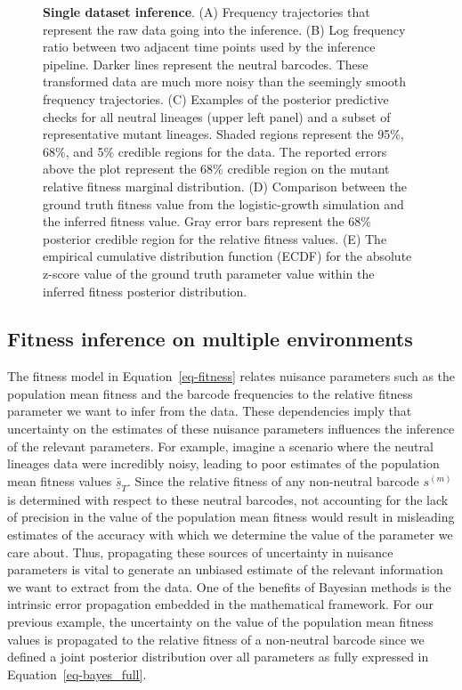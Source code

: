 \documentclass[
]{scrartcl}
\begin{document}
\begin{refsegment}
\begin{figure}
\caption{\label{fig-02}\textbf{Single dataset inference}. (A) Frequency
trajectories that represent the raw data going into the inference. (B)
Log frequency ratio between two adjacent time points used by the
inference pipeline. Darker lines represent the neutral barcodes. These
transformed data are much more noisy than the seemingly smooth frequency
trajectories. (C) Examples of the posterior predictive checks for all
neutral lineages (upper left panel) and a subset of representative
mutant lineages. Shaded regions represent the 95\%, 68\%, and 5\%
credible regions for the data. The reported errors above the plot
represent the 68\% credible region on the mutant relative fitness
marginal distribution. (D) Comparison between the ground truth fitness
value from the logistic-growth simulation and the inferred fitness
value. Gray error bars represent the 68\% posterior credible region for
the relative fitness values. (E) The empirical cumulative distribution
function (ECDF) for the absolute z-score value of the ground truth
parameter value within the inferred fitness posterior distribution.}

\end{figure}

\hypertarget{sec-multienv}{%
\subsection{Fitness inference on multiple
environments}\label{sec-multienv}}

The fitness model in Equation~\ref{eq-fitness} relates nuisance
parameters such as the population mean fitness and the barcode
frequencies to the relative fitness parameter we want to infer from the
data. These dependencies imply that uncertainty on the estimates of
these nuisance parameters influences the inference of the relevant
parameters. For example, imagine a scenario where the neutral lineages
data were incredibly noisy, leading to poor estimates of the population
mean fitness values \(\underline{\bar{s}}_T\). Since the relative
fitness of any non-neutral barcode \(s^{(m)}\) is determined with
respect to these neutral barcodes, not accounting for the lack of
precision in the value of the population mean fitness would result in
misleading estimates of the accuracy with which we determine the value
of the parameter we care about. Thus, propagating these sources of
uncertainty in nuisance parameters is vital to generate an unbiased
estimate of the relevant information we want to extract from the data.
One of the benefits of Bayesian methods is the intrinsic error
propagation embedded in the mathematical framework. For our previous
example, the uncertainty on the value of the population mean fitness
values is propagated to the relative fitness of a non-neutral barcode
since we defined a joint posterior distribution over all parameters as
fully expressed in Equation~\ref{eq-bayes_full}.


\end{refsegment}
\end{document}
